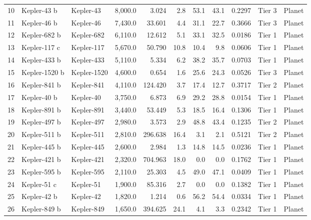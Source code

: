 {\begin{longtable}{r l l r r r r r r l l}
10 & Kepler-43 b      & Kepler-43    &   8,000.0 &   3.024 &   2.8 &   53.1 &   43.1 &  0.2297 & Tier 3  & Planet \\
11 & Kepler-46 b      & Kepler-46    &   7,430.0 &  33.601 &   4.4 &   31.1 &   22.7 &  0.3666 & Tier 3  & Planet \\
12 & Kepler-682 b     & Kepler-682   &   6,110.0 &  12.612 &   5.1 &   33.1 &   32.5 &  0.0186 & Tier 1  & Planet \\
13 & Kepler-117 c     & Kepler-117   &   5,670.0 &  50.790 &  10.8 &   10.4 &    9.8 &  0.0606 & Tier 1  & Planet \\
14 & Kepler-433 b     & Kepler-433   &   5,110.0 &   5.334 &   6.2 &   38.2 &   35.7 &  0.0703 & Tier 1  & Planet \\
15 & Kepler-1520 b    & Kepler-1520  &   4,600.0 &   0.654 &   1.6 &   25.6 &   24.3 &  0.0526 & Tier 3  & Planet \\
16 & Kepler-841 b     & Kepler-841   &   4,110.0 & 124.420 &   3.7 &   17.4 &   12.7 &  0.3717 & Tier 2  & Planet \\
17 & Kepler-40 b      & Kepler-40    &   3,750.0 &   6.873 &   6.9 &   29.2 &   28.8 &  0.0154 & Tier 1  & Planet \\
18 & Kepler-891 b     & Kepler-891   &   3,440.0 &  53.449 &   5.3 &   18.5 &   16.4 &  0.1306 & Tier 1  & Planet \\
19 & Kepler-497 b     & Kepler-497   &   2,980.0 &   3.573 &   2.9 &   48.8 &   43.4 &  0.1235 & Tier 2  & Planet \\
20 & Kepler-511 b     & Kepler-511   &   2,810.0 & 296.638 &  16.4 &    3.1 &    2.1 &  0.5121 & Tier 2  & Planet \\
21 & Kepler-445 b     & Kepler-445   &   2,600.0 &   2.984 &   1.3 &   14.8 &   14.5 &  0.0236 & Tier 1  & Planet \\
22 & Kepler-421 b     & Kepler-421   &   2,320.0 & 704.963 &  18.0 &    0.0 &    0.0 &  0.1762 & Tier 1  & Planet \\
23 & Kepler-595 b     & Kepler-595   &   2,110.0 &  25.303 &   4.5 &   49.0 &   47.1 &  0.0409 & Tier 1  & Planet \\
24 & Kepler-51 c      & Kepler-51    &   1,900.0 &  85.316 &   2.7 &    0.0 &    0.0 &  0.1382 & Tier 1  & Planet \\
25 & Kepler-42 b      & Kepler-42    &   1,820.0 &   1.214 &   0.6 &   56.2 &   54.4 &  0.0334 & Tier 1  & Planet \\
26 & Kepler-849 b     & Kepler-849   &   1,650.0 & 394.625 &  24.1 &    4.1 &    3.3 &  0.2342 & Tier 1  & Planet \\

\end{longtable}}
